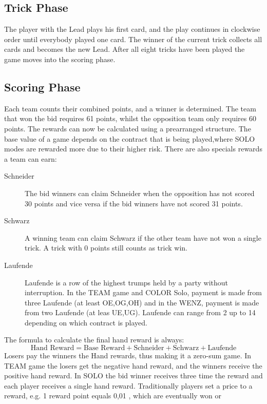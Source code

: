 \subsection{Trick Phase}
The player with the Lead plays his first card, and the play continues in clockwise order until everybody played one
card.
The winner of the current trick collects all cards and becomes the new Lead.
After all eight tricks have been played the game moves into the scoring phase.

\subsection{Scoring Phase}\label{scoringphase}
Each team counts their combined points, and a winner is determined.
The team that won the bid requires 61 points, whilst the opposition team only requires 60 points.
The rewards can now be calculated using a prearranged structure.
The base value of a game depends on the contract
that is being played,where SOLO modes are rewarded more due to their higher risk.
\newline
There are also specials rewards a team can earn:
\begin{description}
    \item[Schneider] The bid winners can claim Schneider when the opposition has not scored 30 points and vice versa
    if the bid winners have not scored 31 points.
    \item[Schwarz] A winning team can claim Schwarz if the other team have not won a single trick.
    A trick with 0 points still counts as trick win.
    \item[Laufende] Laufende is a row of the highest trumps held by a party without interruption.
    In the TEAM game and COLOR Solo, payment is made from three Laufende (at least OE,OG,OH) and in the WENZ,
    payment is made from two Laufende (at leas UE,UG).
    Laufende can range from 2 up to 14 depending on which contract is played.
\end{description}
The formula to calculate the final hand reward is always:
\[\text{Hand Reward} = \text{Base Reward} + \text{Schneider} + \text{Schwarz} + \text{Laufende}\]
Losers pay the winners the Hand rewards, thus making it a zero-sum game.
In TEAM game the losers get the negative hand reward, and the winners receive the positive hand reward.
In SOLO the bid winner receives three time the reward and each player receives a single hand reward.
Traditionally players set a price to a reward, e.g. 1 reward point equals 0,01 \texteuro, which are eventually won or
